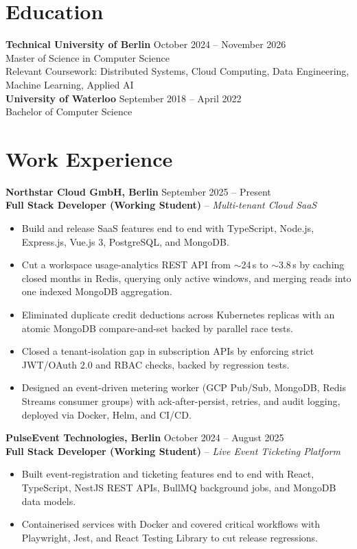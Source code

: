 \documentclass[10pt,a4paper]{article}
\begin{document}
\section*{Education}
\textbf{Technical University of Berlin} \hfill October 2024 -- November 2026\\
Master of Science in Computer Science\\
Relevant Coursework: Distributed Systems, Cloud Computing, Data Engineering, Machine Learning, Applied AI\\[2pt]
\textbf{University of Waterloo} \hfill September 2018 -- April 2022\\
Bachelor of Computer Science

\section*{Work Experience}

\textbf{Northstar Cloud GmbH, Berlin} \hfill September 2025 -- Present\\
\textbf{Full Stack Developer (Working Student)} -- \textit{Multi-tenant Cloud SaaS}
\begin{itemize}
    \item Build and release SaaS features end to end with TypeScript, Node.js, Express.js, Vue.js 3, PostgreSQL, and MongoDB.
    \item Cut a workspace usage-analytics REST API from $\sim$24\,s to $\sim$3.8\,s by caching closed months in Redis, querying only active windows, and merging reads into one indexed MongoDB aggregation.
    \item Eliminated duplicate credit deductions across Kubernetes replicas with an atomic MongoDB compare-and-set backed by parallel race tests.
    \item Closed a tenant-isolation gap in subscription APIs by enforcing strict JWT/OAuth 2.0 and RBAC checks, backed by regression tests.
    \item Designed an event-driven metering worker (GCP Pub/Sub, MongoDB, Redis Streams consumer groups) with ack-after-persist, retries, and audit logging, deployed via Docker, Helm, and CI/CD.
\end{itemize}

\vspace{2pt}
\textbf{PulseEvent Technologies, Berlin} \hfill October 2024 -- August 2025\\
\textbf{Full Stack Developer (Working Student)} -- \textit{Live Event Ticketing Platform}
\begin{itemize}
    \item Built event-registration and ticketing features end to end with React, TypeScript, NestJS REST APIs, BullMQ background jobs, and MongoDB data models.
    \item Containerised services with Docker and covered critical workflows with Playwright, Jest, and React Testing Library to cut release regressions.
\end{itemize}
\end{document}
